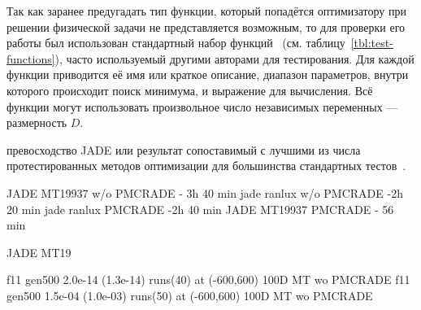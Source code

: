 Так как заранее предугадать тип функции, который попадётся
оптимизатору при решении физической задачи не представляется
возможным, то для проверки его работы был использован стандартный
набор
функций~\cite{Schwefel-1981,Rosenbrock-1960,Muhlenbein-1991,back-1996,Griewank-1981}
(см. таблицу~\ref{tbl:test-functions}), часто используемый другими
авторами для тестирования. Для каждой функции приводится её имя или
краткое описание, диапазон параметров, внутри которого происходит
поиск минимума, и выражение для вычисления. Всё функции могут
использовать произвольное число независимых переменных --- размерность
$D$.


превосходство JADE или результат сопоставимый с лучшими из числа
протестированных методов оптимизации для большинства стандартных
тестов~\cite{Schwefel-1981,Rosenbrock-1960,Muhlenbein-1991,back-1996,Griewank-1981}.

JADE MT19937 w/o PMCRADE - 3h 40 min
jade ranlux w/o PMCRADE -2h 20 min
jade ranlux  PMCRADE -2h 40 min
JADE MT19937  PMCRADE - 56 min

JADE MT19

f11	gen500	2.0e-14 (1.3e-14) runs(40) at (-600,600)   100D MT wo PMCRADE
f11	gen500	1.5e-04 (1.0e-03) runs(50) at (-600,600) 100D MT wo PMCRADE


\begingroup %
\newcommand\z{\bfseries}
\newcommand\altshape{\ifthenelse{\therowcnt = 0 }{%
}{
  \ifnumodd{\value{rowcnt}}{}{\vspace*{-0.8ex}}}
}
\newcolumntype{A}{ >{\altshape}X[1mc]}

